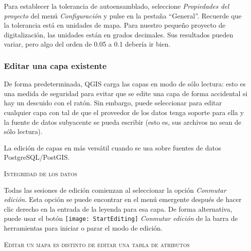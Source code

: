 Para establecer la tolerancia de autoensamblado, seleccione \textsl{Propiedades del proyecto} del menú \textsl{Configuración} y pulse en la pestaña ``General''.  Recuerde que la tolerancia está en unidades de mapa. Para nuestro pequeño proyecto de digitalización, las unidades están en grados decimales. Sus resultados pueden variar, pero algo del orden de 0.05 a 0.1 debería ir bien.

\subsubsection{Editar una capa existente}
\label{sec:edit_existing_layer}

De forma predeterminada, QGIS carga las capas en modo de sólo lectura: esto es una medida de seguridad para evitar que se edite una capa de forma accidental si hay un descuido con el ratón. Sin embargo, puede seleccionar para editar cualquier capa con tal de que el proveedor de los datos tenga soporte para ella y la fuente de datos subyacente se pueda escribir (esto es, sus archivos no sean de sólo lectura).

La edición de capas en más versátil cuando se usa sobre fuentes de datos PostgreSQL/PostGIS.

\begin{Tip}[h]\caption{\textsc{Integridad de los datos}}
\end{Tip}

Todas las sesiones de edición comienzan al seleccionar la opción \textit{Conmutar edición}. Esta opción se puede encontrar en el menú emergente después de hacer clic derecho en la entrada de la leyenda para esa capa. De forma alternativa, puede usar el botón  \texttt{[image: StartEditing]} 
\textit{Conmutar edición} de la barra de herramientas para iniciar o parar el modo de edición.

\begin{Tip}[h]\caption{\textsc{Editar un mapa es distinto de editar una tabla de atributos}}
\end{Tip}

